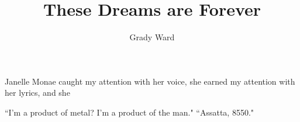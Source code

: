 \documentclass[11pt]{amsart}
\title{These Dreams are Forever}
\author{Grady Ward}
\date{}
\begin{document}
\nocite{*}
\maketitle

Janelle Monae caught my attention with her voice, she earned my attention with her lyrics, and she 


``I'm a product of metal? I'm a product of the man."\cite{happyhunting}
``Assatta, 8550."\cite{happyhunting}

{}

\end{document}
